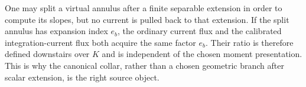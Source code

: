 One may split a virtual annulus after a finite separable extension in order
to compute its slopes, but no current is pulled back to that extension.  If
the split annulus has expansion index \(e_b\), the ordinary current flux and
the calibrated integration-current flux both acquire the same factor
\(e_b\).  Their ratio is therefore defined downstairs over \(K\) and is
independent of the chosen moment presentation.  This is why the canonical
collar, rather than a chosen geometric branch after scalar extension, is the
right source object.
